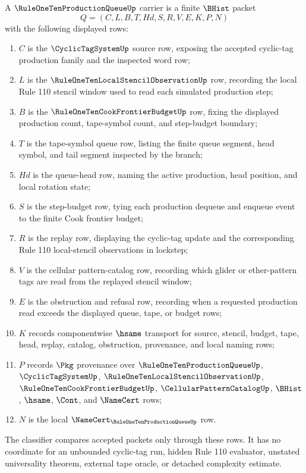 \begin{definition}
\label{def:rule-one-ten-production-queue-carrier}
A $\RuleOneTenProductionQueueUp$ carrier is a finite $\BHist$ packet
$$
Q=(C,L,B,T,Hd,S,R,V,E,K,P,N)
$$
with the following displayed rows:
\begin{enumerate}
\item $C$ is the $\CyclicTagSystemUp$ source row, exposing the accepted cyclic-tag production family and the inspected word row;
\item $L$ is the $\RuleOneTenLocalStencilObservationUp$ row, recording the local Rule 110 stencil window used to read each simulated production step;
\item $B$ is the $\RuleOneTenCookFrontierBudgetUp$ row, fixing the displayed production count, tape-symbol count, and step-budget boundary;
\item $T$ is the tape-symbol queue row, listing the finite queue segment, head symbol, and tail segment inspected by the branch;
\item $Hd$ is the queue-head row, naming the active production, head position, and local rotation state;
\item $S$ is the step-budget row, tying each production dequeue and enqueue event to the finite Cook frontier budget;
\item $R$ is the replay row, displaying the cyclic-tag update and the corresponding Rule 110 local-stencil observations in lockstep;
\item $V$ is the cellular pattern-catalog row, recording which glider or ether-pattern tags are read from the replayed stencil window;
\item $E$ is the obstruction and refusal row, recording when a requested production read exceeds the displayed queue, tape, or budget rows;
\item $K$ records componentwise $\hsame$ transport for source, stencil, budget, tape, head, replay, catalog, obstruction, provenance, and local naming rows;
\item $P$ records $\Pkg$ provenance over $\RuleOneTenProductionQueueUp$, $\CyclicTagSystemUp$, $\RuleOneTenLocalStencilObservationUp$, $\RuleOneTenCookFrontierBudgetUp$, $\CellularPatternCatalogUp$, $\BHist$, $\hsame$, $\Cont$, and $\NameCert$ rows;
\item $N$ is the local $\NameCert_{\RuleOneTenProductionQueueUp}$ row.
\end{enumerate}
The classifier compares accepted packets only through these rows. It has no coordinate for an unbounded cyclic-tag run, hidden Rule 110 evaluator, unstated universality theorem, external tape oracle, or detached complexity estimate.
\end{definition}

